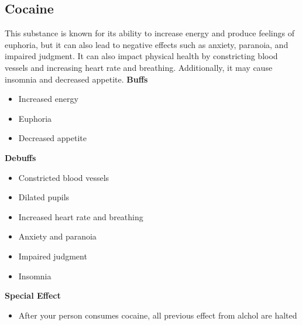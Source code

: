 \documentclass{book}
\begin{document}
\subsection{Cocaine}
This substance is known for its ability to increase energy and produce feelings of euphoria, but it can also lead to negative effects such as anxiety, paranoia, and impaired judgment. It can also impact physical health by constricting blood vessels and increasing heart rate and breathing. Additionally, it may cause insomnia and decreased appetite.
\newline
\textbf{Buffs}
    \begin{itemize}
        \item Increased energy
        \item Euphoria
        \item Decreased appetite
    \end{itemize}
\textbf{Debuffs}
    \begin{itemize}
        \item Constricted blood vessels
        \item Dilated pupils
        \item Increased heart rate and breathing
        \item Anxiety and paranoia
        \item Impaired judgment
        \item Insomnia
    \end{itemize}
\textbf{Special Effect}
    \begin{itemize}
        \item After your person consumes cocaine, all previous effect from alchol are halted
    \end{itemize}
\end{document}
